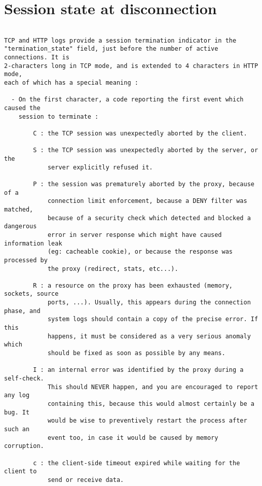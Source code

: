 
\section{Session state at disconnection}

\begin{verbatim}

TCP and HTTP logs provide a session termination indicator in the
"termination_state" field, just before the number of active connections. It is
2-characters long in TCP mode, and is extended to 4 characters in HTTP mode,
each of which has a special meaning :

  - On the first character, a code reporting the first event which caused the
    session to terminate :

        C : the TCP session was unexpectedly aborted by the client.

        S : the TCP session was unexpectedly aborted by the server, or the
            server explicitly refused it.

        P : the session was prematurely aborted by the proxy, because of a
            connection limit enforcement, because a DENY filter was matched,
            because of a security check which detected and blocked a dangerous
            error in server response which might have caused information leak
            (eg: cacheable cookie), or because the response was processed by
            the proxy (redirect, stats, etc...).

        R : a resource on the proxy has been exhausted (memory, sockets, source
            ports, ...). Usually, this appears during the connection phase, and
            system logs should contain a copy of the precise error. If this
            happens, it must be considered as a very serious anomaly which
            should be fixed as soon as possible by any means.

        I : an internal error was identified by the proxy during a self-check.
            This should NEVER happen, and you are encouraged to report any log
            containing this, because this would almost certainly be a bug. It
            would be wise to preventively restart the process after such an
            event too, in case it would be caused by memory corruption.

        c : the client-side timeout expired while waiting for the client to
            send or receive data.


\end{verbatim}
